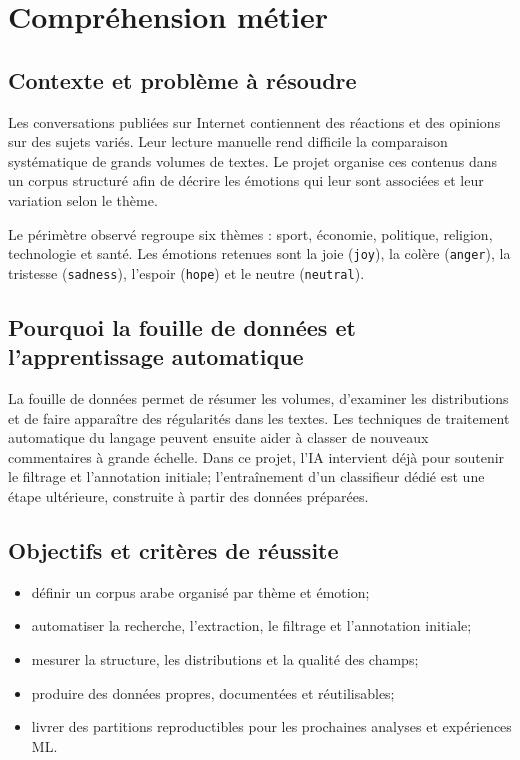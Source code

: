 \documentclass[11pt,a4paper]{article}
\begin{document}
\section{Compréhension métier}
\subsection{Contexte et problème à résoudre}
Les conversations publiées sur Internet contiennent des réactions et des opinions sur des sujets variés. Leur lecture manuelle rend difficile la comparaison systématique de grands volumes de textes. Le projet organise ces contenus dans un corpus structuré afin de décrire les émotions qui leur sont associées et leur variation selon le thème.

Le périmètre observé regroupe six thèmes : sport, économie, politique, religion, technologie et santé. Les émotions retenues sont la joie (\texttt{joy}), la colère (\texttt{anger}), la tristesse (\texttt{sadness}), l'espoir (\texttt{hope}) et le neutre (\texttt{neutral}).

\subsection{Pourquoi la fouille de données et l'apprentissage automatique}
La fouille de données permet de résumer les volumes, d'examiner les distributions et de faire apparaître des régularités dans les textes. Les techniques de traitement automatique du langage peuvent ensuite aider à classer de nouveaux commentaires à grande échelle. Dans ce projet, l'IA intervient déjà pour soutenir le filtrage et l'annotation initiale; l'entraînement d'un classifieur dédié est une étape ultérieure, construite à partir des données préparées.

\subsection{Objectifs et critères de réussite}
\begin{itemize}
  \item définir un corpus arabe organisé par thème et émotion;
  \item automatiser la recherche, l'extraction, le filtrage et l'annotation initiale;
  \item mesurer la structure, les distributions et la qualité des champs;
  \item produire des données propres, documentées et réutilisables;
  \item livrer des partitions reproductibles pour les prochaines analyses et expériences ML.
\end{itemize}
\end{document}
